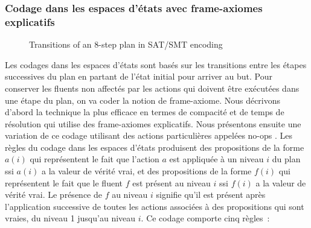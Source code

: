 %
%


{\color{red}

\subsubsection{Codage dans les espaces d'états avec frame-axiomes explicatifs}

\begin{figure}\label{steps:sat}
\begin{footnotesize}

\end{footnotesize}
\vspace{1em}
\caption{Transitions of an 8-step plan in SAT/SMT encoding}
\end{figure}


Les codages dans les espaces d'états sont basés sur les transitions entre les étapes successives du plan en partant de l'état initial pour arriver au but.
Pour conserver les fluents non affectés par les actions qui doivent être exécutées dans une étape du plan, on va coder la notion de frame-axiome.
Nous décrivons d'abord la technique la plus efficace en termes de compacité et
de temps de résolution \cite{MK99} qui utilise des frame-axiomes explicatifs.
Nous présentons ensuite une variation de ce codage utilisant des actions
particulières appelées no-ops \cite{KMS96}.
Les règles du codage dans les espaces d'états produisent des propositions de la
forme $a(i)$ qui représentent le fait que l'action $a$ est appliquée à un niveau
$i$ du plan ssi $a(i)$ a la valeur de vérité vrai, et des propositions de la
forme $f(i)$ qui représentent le fait que le fluent $f$ est présent au niveau
$i$ ssi $f(i)$ a la valeur de vérité vrai. Le présence de $f$ au niveau $i$
signifie qu'il est présent après l'application successive de toutes les
actions associées à des propositions qui sont vraies, du niveau 1 jusqu'au
niveau $i$. Ce codage comporte cinq règles~:

} %


